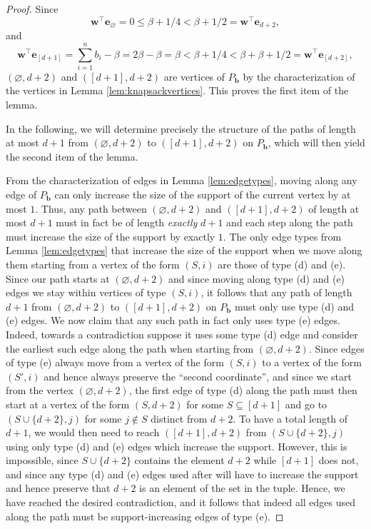 \documentclass[centering,11pt,reqno]{amsart}
\theoremstyle{definition}
\renewcommand{\emptyset}{\varnothing}
\begin{document}
\begin{proof}
Since 
\[\mathbf{w}^{\intercal} \mathbf{e}_{\emptyset} = 0 \leq \beta +1/4 < \beta +1/2 = \mathbf{w}^{\intercal} \mathbf{e}_{d+2},\] and 
\[\mathbf{w}^{\intercal} \mathbf{e}_{[d+1]} = \sum_{i=1}^{n} b_{i} -\beta = 2\beta - \beta = \beta < \beta + 1/4 < \beta + \beta +1/2 = \mathbf{w}^{\intercal} \mathbf{e}_{[d+2]},\]
$(\emptyset,d+2)$ and $([d+1],d+2)$ are vertices of $P_{\mathbf{b}}$ by the characterization of the vertices in Lemma \ref{lem:knapsackvertices}. This proves the first item of the lemma.

In the following, we will determine precisely the structure of the paths of length at most $d+1$ from $(\emptyset,d+2)$ to $([d+1],d+2)$ on $P_\mathbf{b}$, which will then yield the second item of the lemma.

From the characterization of edges in Lemma \ref{lem:edgetypes}, moving along any edge of $P_\mathbf{b}$ can only increase the size of the support of the current vertex by at most $1$. Thus, any path between $(\emptyset, d+2)$ and $([d+1], d+2)$ of length at most $d+1$ must in fact be of length \emph{exactly} $d+1$ and each step along the path must increase the size of the support by exactly $1$. The only edge types from Lemma \ref{lem:edgetypes} that increase the size of the support when we move along them starting from a vertex of the form $(S,i)$ are those of type (d) and (e). Since our path starts at $(\emptyset, d+2)$ and since moving along type (d) and (e) edges we stay within vertices of type $(S,i)$, it follows that any path of length $d+1$ from $(\emptyset,d+2)$ to $([d+1],d+2)$ on $P_\mathbf{b}$ must only use type (d) and (e) edges. We now claim that any such path in fact only uses type (e) edges. Indeed, towards a contradiction suppose it uses some type (d) edge and consider the earliest such edge along the path when starting from $(\emptyset, d+2)$. Since edges of type (e) always move from a vertex of the form $(S,i)$ to a vertex of the form $(S',i)$ and hence always preserve the ``second coordinate'', and since we start from the vertex $(\emptyset,d+2)$, the first edge of type (d) along the path must then start at a vertex of the form $(S,d+2)$ for some $S\subseteq [d+1]$ and go to $(S\cup \{d+2\},j)$ for some $j\notin S$ distinct from $d+2$. To have a total length of $d+1$, we would then need to reach $([d+1],d+2)$ from $(S\cup \{d+2\},j)$ using only type (d) and (e) edges which increase the support. However, this is impossible, since $S\cup \{d+2\}$ contains the element $d+2$ while $[d+1]$ does not, and since any type (d) and (e) edges used after will have to increase the support and hence preserve that $d+2$ is an element of the set in the tuple. Hence, we have reached the desired contradiction, and it follows that indeed all edges used along the path must be support-increasing edges of type (e).


\end{proof}
\end{document}
